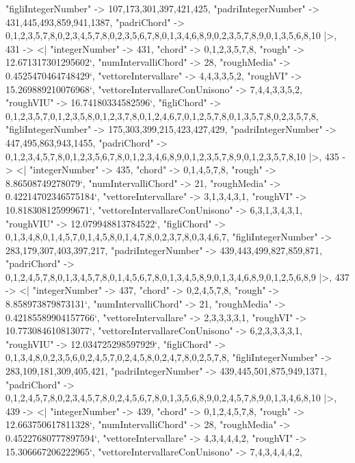 \documentclass[
]{article}
\begin{document}
\begin{DatasetVerbatim}
    "figliIntegerNumber" -> {107,173,301,397,421,425},
    "padriIntegerNumber" -> {431,445,493,859,941,1387},
    "padriChord" -> {{0,1,2,3,5,7,8},{0,2,3,4,5,7,8},{0,2,3,5,6,7,8},{0,1,3,4,6,8,9},{0,2,3,5,7,8,9},{0,1,3,5,6,8,10}}
  |>,
  431 -> <|
    "integerNumber" -> 431,
    "chord" -> {0,1,2,3,5,7,8},
    "rough" -> 12.671317301295602`,
    "numIntervalliChord" -> 28,
    "roughMedia" -> 0.4525470464748429`,
    "vettoreIntervallare" -> {4,4,3,3,5,2},
    "roughVI" -> 15.269889210076968`,
    "vettoreIntervallareConUnisono" -> {7,4,4,3,3,5,2},
    "roughVIU" -> 16.74180334582596`,
    "figliChord" -> {{0,1,2,3,5,7},{0,1,2,3,5,8},{0,1,2,3,7,8},{0,1,2,4,6,7},{0,1,2,5,7,8},{0,1,3,5,7,8},{0,2,3,5,7,8}},
    "figliIntegerNumber" -> {175,303,399,215,423,427,429},
    "padriIntegerNumber" -> {447,495,863,943,1455},
    "padriChord" -> {{0,1,2,3,4,5,7,8},{0,1,2,3,5,6,7,8},{0,1,2,3,4,6,8,9},{0,1,2,3,5,7,8,9},{0,1,2,3,5,7,8,10}}
  |>,
  435 -> <|
    "integerNumber" -> 435,
    "chord" -> {0,1,4,5,7,8},
    "rough" -> 8.86508749278079`,
    "numIntervalliChord" -> 21,
    "roughMedia" -> 0.42214702346575184`,
    "vettoreIntervallare" -> {3,1,3,4,3,1},
    "roughVI" -> 10.818308125999671`,
    "vettoreIntervallareConUnisono" -> {6,3,1,3,4,3,1},
    "roughVIU" -> 12.079948813784522`,
    "figliChord" -> {{0,1,3,4,8},{0,1,4,5,7},{0,1,4,5,8},{0,1,4,7,8},{0,2,3,7,8},{0,3,4,6,7}},
    "figliIntegerNumber" -> {283,179,307,403,397,217},
    "padriIntegerNumber" -> {439,443,499,827,859,871},
    "padriChord" -> {{0,1,2,4,5,7,8},{0,1,3,4,5,7,8},{0,1,4,5,6,7,8},{0,1,3,4,5,8,9},{0,1,3,4,6,8,9},{0,1,2,5,6,8,9}}
  |>,
  437 -> <|
    "integerNumber" -> 437,
    "chord" -> {0,2,4,5,7,8},
    "rough" -> 8.858973879873131`,
    "numIntervalliChord" -> 21,
    "roughMedia" -> 0.42185589904157766`,
    "vettoreIntervallare" -> {2,3,3,3,3,1},
    "roughVI" -> 10.773084610813077`,
    "vettoreIntervallareConUnisono" -> {6,2,3,3,3,3,1},
    "roughVIU" -> 12.034725298597929`,
    "figliChord" -> {{0,1,3,4,8},{0,2,3,5,6},{0,2,4,5,7},{0,2,4,5,8},{0,2,4,7,8},{0,2,5,7,8}},
    "figliIntegerNumber" -> {283,109,181,309,405,421},
    "padriIntegerNumber" -> {439,445,501,875,949,1371},
    "padriChord" -> {{0,1,2,4,5,7,8},{0,2,3,4,5,7,8},{0,2,4,5,6,7,8},{0,1,3,5,6,8,9},{0,2,4,5,7,8,9},{0,1,3,4,6,8,10}}
  |>,
  439 -> <|
    "integerNumber" -> 439,
    "chord" -> {0,1,2,4,5,7,8},
    "rough" -> 12.663750617811328`,
    "numIntervalliChord" -> 28,
    "roughMedia" -> 0.45227680777897594`,
    "vettoreIntervallare" -> {4,3,4,4,4,2},
    "roughVI" -> 15.306667206222965`,
    "vettoreIntervallareConUnisono" -> {7,4,3,4,4,4,2},

\end{DatasetVerbatim}
\end{document}
